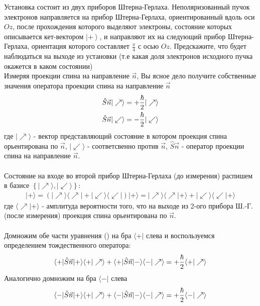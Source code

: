 \documentclass[__main__.tex]{subfiles}
\begin{document}
	
	Установка состоит из двух приборов Штерна-Герлаха. Неполяризованный пучок электронов направляется на прибор Штерна-Герлаха, ориентированный вдоль оси $Oz$, после прохождения которого выделяют электроны, состояние которых описывается кет-вектором $\left|+\right>$, и направляют их на следующий прибор Штерна-Герлаха, ориентация которого составляет $\frac{\pi}{4}$ с осью $Oz$. Предскажите, что будет наблюдаться на выходе из установки (т.е какая доля электронов исходного пучка окажется в каком состоянии)\\ 
	
	Измеряя проекции спина на направление $\vec{n}$, Вы ясное дело получите собственные значения оператора проекции спина на направление $\vec{n}$
	\begin{gather}
		\llabel{ch-16-1}
		\hat{S}\vec{n}|\nearrow \rangle = +\frac{\hbar}{2}|\nearrow \rangle\\
		\hat{S}\vec{n}|\swarrow \rangle = -\frac{\hbar}{2}|\swarrow \rangle
	\end{gather}
	где $|\nearrow \rangle$ - вектор представляющий состояние в котором проекция спина орьентирована по $\vec{n}$, $|\swarrow \rangle$ - соответсвенно против $\vec{n}$, $\hat{S}\vec{n}$ - оператор проекции спина на направление $\vec{n}$.\\\\
	Состояние на входе во второй прибор Штерна-Герлаха (до измерения) распишем в базисе $\left\{|\nearrow\rangle , |\swarrow \rangle \right\}$:
	\begin{gather*}
		|+\rangle = \left(|\nearrow\rangle\langle\nearrow|+|\swarrow\rangle\langle\swarrow|\right)|+\rangle = |\nearrow\rangle\langle\nearrow|+\rangle+|\swarrow\rangle\langle\swarrow|+\rangle
	\end{gather*}
	где $\langle\nearrow|+\rangle$ - амплитуда вероятности того, что на выходе из 2-ого прибора Ш.-Г.(после измерения) проекция спина орьентирована по $\vec{n}$.\\\\
	Домножим обе части уравнения () на бра $\langle+|$ слева и воспользуемся определением тождественного оператора:
	\begin{gather}
		\llabel{ch-16-2}
		\langle+|\hat{S}\vec{n}|+\rangle\langle+|\nearrow\rangle+\langle+|\hat{S}\vec{n}|-\rangle\langle-|\nearrow\rangle = +\frac{\hbar}{2}\langle+|\nearrow\rangle
	\end{gather}
	Аналогично домножим на бра $\langle-|$ слева
	\begin{gather}
		\llabel{ch-16-3}
		\langle-|\hat{S}\vec{n}|+\rangle\langle+|\nearrow\rangle+\langle-|\hat{S}\vec{n}|-\rangle\langle-|\nearrow\rangle = +\frac{\hbar}{2}\langle-|\nearrow\rangle
	\end{gather}
\end{document}
